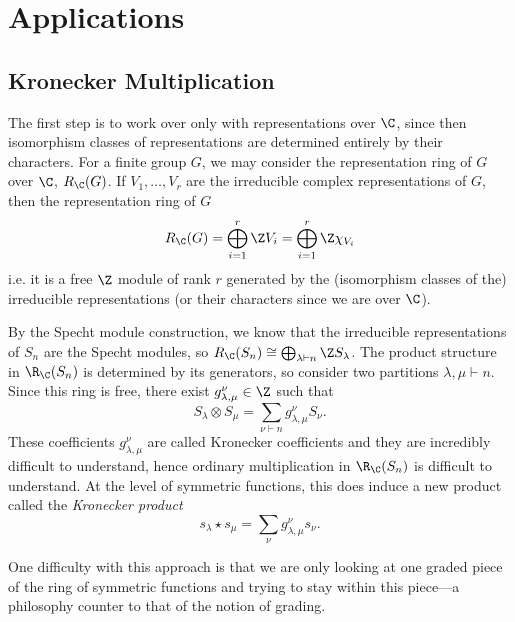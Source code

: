 \documentclass[../main.tex]{subfiles}
\begin{document}
\section{Applications}

\subsection{Kronecker Multiplication}
The first step is to work over only with representations over $ \C $, since then isomorphism classes of representations are determined entirely by their characters. For a finite group $ G $, we may consider the representation ring of $ G $ over $ \C $, $ R_\C(G) $. If $  V_{1},\ldots,V_{r}  $ are the irreducible complex representations of $ G $, then the representation ring of $ G $
\[
  R_{\C}(G) = \bigoplus_{i=1}^{r}\Z V_{i} = \bigoplus_{i=1}^{r}\Z\chi_{V_{i}}
\]
i.e. it is a free $ \Z $ module of rank $ r $ generated by the (isomorphism classes of the) irreducible representations (or their characters since we are over $ \C $). 

By the Specht module construction, we know that the irreducible representations of $ S_{n} $ are the Specht modules, so $ R_{\C}(S_{n}) \cong \bigoplus_{\lambda\vdash n}\Z S_{\lambda} $. The product structure in $ \R_{\C}(S_{n}) $ is determined by its generators, so consider two partitions $ \lambda,\mu\vdash n $. Since this ring is free, there exist $ g_{\lambda,\mu}^{\nu}\in \Z $ such that
\[
  S_{\lambda}\otimes S_{\mu} = \sum_{\nu\vdash n} g_{\lambda,\mu}^{\nu} S_{\nu}.
\]
These coefficients $ g_{\lambda,\mu}^{\nu} $ are called Kronecker coefficients and they are incredibly difficult to understand, hence ordinary multiplication in $ \R_{\C}(S_{n}) $ is difficult to understand. At the level of symmetric functions, this does induce a new product called the \textit{Kronecker product}
\[
  s_{\lambda}\star s_{\mu} = \sum_{\nu} g_{\lambda,\mu}^{\nu} s_{\nu}.
\]

One difficulty with this approach is that we are only looking at one graded piece of the ring of symmetric functions and trying to stay within this piece---a philosophy counter to that of the notion of grading. 
\end{document}
